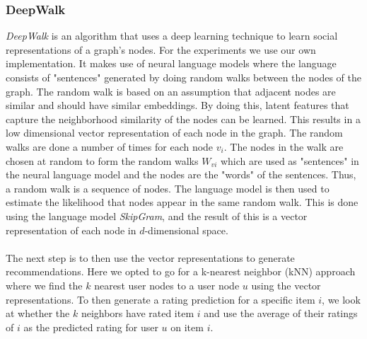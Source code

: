 \subsubsection{DeepWalk}
\textit{DeepWalk} is an algorithm that uses a deep learning technique to learn social representations of a graph's nodes\cite{DeepWalk}.
For the experiments we use our own implementation.
It makes use of neural language models where the language consists of "sentences" generated by doing random walks between the nodes of the graph.
The random walk is based on an assumption that adjacent nodes are similar and should have similar embeddings.
By doing this, latent features that capture the neighborhood similarity of the nodes can be learned.
This results in a low dimensional vector representation of each node in the graph.
The random walks are done a number of times for each node $v_i$.
The nodes in the walk are chosen at random to form the random walks $W_{vi}$ which are used as "sentences" in the neural language model and the nodes are the "words" of the sentences.
Thus, a random walk is a sequence of nodes.
The language model is then used to estimate the likelihood that nodes appear in the same random walk.
This is done using the language model \textit{SkipGram}, and the result of this is a vector representation of each node in $d$-dimensional space.
\\\\
The next step is to then use the vector representations to generate recommendations.
Here we opted to go for a k-nearest neighbor (kNN) approach where we find the $k$ nearest user nodes to a user node $u$ using the vector representations.
To then generate a rating prediction for a specific item $i$, we look at whether the $k$ neighbors have rated item $i$ and use the average of their ratings of $i$ as the predicted rating for user $u$ on item $i$.
